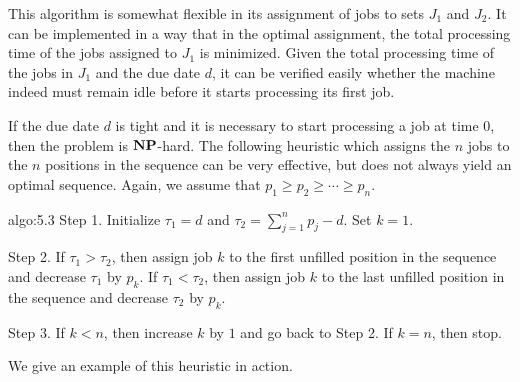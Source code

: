 This algorithm is somewhat flexible in its assignment of jobs to sets $J_1$ and 
$J_2$. It can be implemented in a way that in the optimal assignment, the 
total processing time of the jobs assigned to $J_1$ is minimized. Given the 
total processing time of the jobs in $J_1$ and the due date $d$, it can be 
verified easily whether the machine indeed must remain idle before it starts 
processing its first job.

If the due date $d$ is tight and it is necessary to start processing 
a job at time $0$, then the problem is $\operatorname{\textbf{NP}}$-hard. The following heuristic 
which assigns the $n$ jobs to the $n$ positions in the sequence can be 
very effective, but does not always yield an optimal sequence. Again, we 
assume that $p_1 \geq p_2 \geq \cdots \geq p_n$.  

\begin{algo}{algo:5.3}
    {\sc Step 1.} Initialize $\tau_1 = d$ and $\tau_2 = \sum_{j=1}^n p_j - d$. 
    Set $k = 1$.  

    {\sc Step 2.} If $\tau_1 > \tau_2$, then assign job $k$ to the first 
    unfilled position in the sequence and decrease $\tau_1$ by $p_k$. 
    If $\tau_1 < \tau_2$, then assign job $k$ to the last unfilled position 
    in the sequence and decrease $\tau_2$ by $p_k$. 

    {\sc Step 3.} If $k < n$, then increase $k$ by $1$ and go back to Step 2. 
    If $k = n$, then stop. 
\end{algo}

We give an example of this heuristic in action. 

